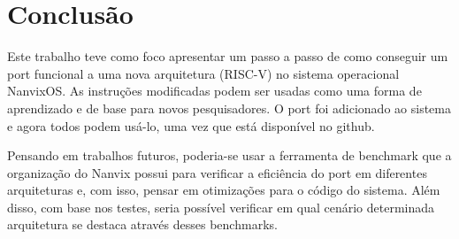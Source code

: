 \section{Conclusão}

Este trabalho teve como foco apresentar um passo a passo de como conseguir um port funcional a uma nova arquitetura (RISC-V) no sistema operacional NanvixOS. 
As instruções modificadas podem ser usadas como uma forma de aprendizado e de base para novos pesquisadores. O port foi adicionado ao sistema e agora todos 
podem usá-lo, uma vez que está disponível no github.

Pensando em trabalhos futuros, poderia-se usar a ferramenta de benchmark que a organização do Nanvix possui para verificar a eficiência do port em diferentes 
arquiteturas e, com isso, pensar em otimizações para o código do sistema. Além disso, com base nos testes, seria possível verificar em qual cenário determinada 
arquitetura se destaca através desses benchmarks.  